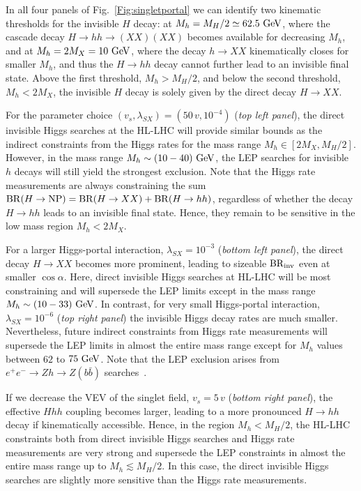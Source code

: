 \documentclass[../report.tex]{subfiles}
\begin{document}
In all four panels of Fig.~\ref{Fig:singletportal} we can identify two kinematic thresholds for the invisible $H$ decay: at $M_h = M_H/2 \simeq 62.5~\text{GeV}$, where the cascade decay $H\to hh\to (XX)(XX)$ becomes available for decreasing $M_h$, and at $M_h = 2 M_X = 10~\text{GeV}$, where the decay $h\to XX$ kinematically closes for smaller $M_h$, and thus the $H\to hh$ decay cannot further lead to an invisible final state. Above the first threshold, $M_h > M_H/2$, and below the second threshold, $M_h < 2M_X$, the invisible $H$ decay is solely given by {the direct decay} $H\to XX$. 

For the parameter choice $(v_s, \lambda_{SX}) = (50\,v, 10^{-4})$ (\emph{top left panel}), the direct invisible Higgs searches at the HL-LHC {will} provide similar bounds as the indirect constraints from the Higgs rates for the mass range $M_h \in [2 M_X, M_H/2]$. However, in the mass range $M_{h}\sim (10-40)~\text{GeV}$, the LEP searches for invisible $h$ decays will still yield the strongest exclusion. Note that the Higgs rate measurements are always constraining the sum $\mathrm{BR}(H\to\mathrm{NP}) = \mathrm{BR}(H\to XX) + \mathrm{BR}(H\to hh)$, regardless of whether the decay $H\to hh$ leads to an invisible final state. Hence, they remain to be sensitive in the low mass region $M_h < 2 M_X$.

For a larger Higgs-portal interaction, $\lambda_{SX} = 10^{-3}$ (\emph{bottom left panel}), the direct decay $H\to XX$ becomes more prominent, leading to sizeable $\mathrm{BR}_\mathrm{inv}$ even at smaller $\cos\alpha$. Here, direct invisible Higgs searches at HL-LHC will be most constraining and will supersede the LEP limits except in the mass range $M_h\sim (10-33)~\text{GeV}$. {In contrast,} for very small Higgs-portal interaction, $\lambda_{SX} = 10^{-6}$ (\emph{top right panel}) {the invisible Higgs decay rates are much smaller. Nevertheless,} future indirect constraints from Higgs rate measurements will supersede the LEP limits {in almost the entire mass range except for $M_h$ values between $62$ to $75~\text{GeV}$.}
Note that the LEP exclusion arises from $e^+e^- \to Zh \to Z(b\bar{b})$ searches~\cite{Schael:2006cr}.

If we decrease the VEV of the singlet field, $v_s = 5\,v$ (\emph{bottom right panel}), the effective $Hhh$ coupling becomes larger, leading to a more pronounced $H\to hh$ decay if kinematically accessible. Hence, in the region $M_{h} < M_H/2$, the HL-LHC constraints both from direct invisible Higgs searches and Higgs rate measurements are very strong and supersede the LEP constraints in almost the entire mass range up to $M_h \lesssim M_H/2$. {In this case, the direct invisible Higgs searches} are slightly more {sensitive} than the {Higgs rate measurements}.
\end{document}
